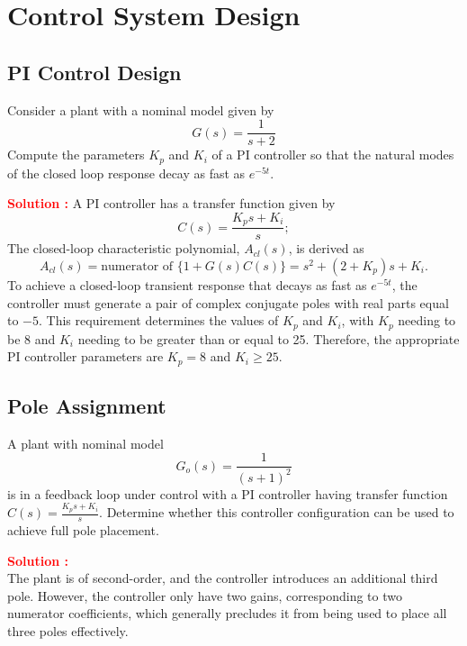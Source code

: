 \documentclass[12pt]{article}
\begin{document}
\clearpage
\section{Control System Design}

\subsection{PI Control Design}
Consider a plant with a nominal model given by
\begin{equation}
G(s) = \frac{1}{s + 2}
\end{equation}
Compute the parameters \(K_p\) and \(K_i\) of a PI controller so that the natural modes of the closed loop response decay as fast as \(e^{-5t}\). 

\textbf{\textcolor{red}{Solution :}}
A PI controller has a transfer function given by
\begin{equation}
C(s) = \frac{K_ps + K_i}{s};
\end{equation}
The closed-loop characteristic polynomial, \(A_{cl}(s)\), is derived as
\begin{equation}
A_{cl}(s) = \text{numerator of } \{1 + G(s)C(s)\} = s^2 + (2 + K_p)s + K_i.
\end{equation}
To achieve a closed-loop transient response that decays as fast as \(e^{-5t}\), the controller must generate a pair of complex conjugate poles with real parts equal to \(-5\). This requirement determines the values of \(K_p\) and \(K_i\), with \(K_p\) needing to be 8 and \(K_i\) needing to be greater than or equal to 25. Therefore, the appropriate PI controller parameters are \(K_p = 8\) and \(K_i \geq 25\).

\clearpage
\subsection{Pole Assignment}

A plant with nominal model 
\begin{equation}
    G_o(s) = \frac{1}{(s + 1)^2}
\end{equation}
is in a feedback loop under control with a PI controller having transfer function $C(s) = \frac{K_ps + K_i}{s}$.
Determine whether this controller configuration can be used to achieve full pole placement.

\textbf{\textcolor{red}{Solution :}} \\ 
The plant is of second-order, and the controller introduces an additional third pole. However, the controller only have two gains, corresponding to two numerator coefficients, which generally precludes it from being used to place all three poles effectively.
\clearpage
\end{document}
